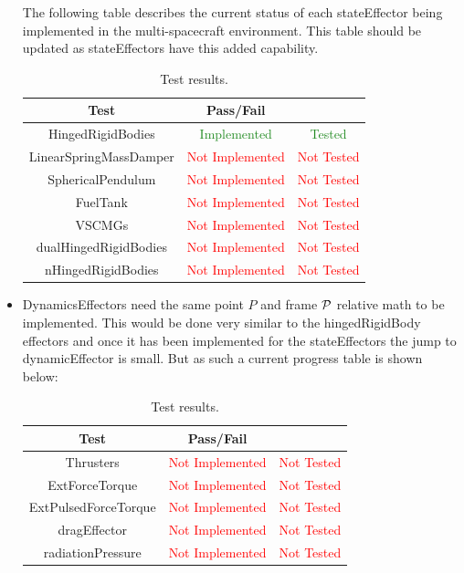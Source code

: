\begin{itemize}
The following table describes the current status of each stateEffector being implemented in the multi-spacecraft environment. This table should be updated as stateEffectors have this added capability. 

\begin{table}[htbp]
	\caption{Test results.}
	\label{tab:results}
	\centering \fontsize{10}{10}\selectfont
	\begin{tabular}{c | c | c } %
		\hline
		\textbf{Test} 				    & \textbf{Pass/Fail} &  \\ \hline
		HingedRigidBodies  & \textcolor{ForestGreen}{Implemented} & \textcolor{ForestGreen}{Tested} \\
		LinearSpringMassDamper  & \textcolor{Red}{Not Implemented} & \textcolor{Red}{Not Tested} \\ 
		SphericalPendulum  & \textcolor{Red}{Not Implemented} & \textcolor{Red}{Not Tested} \\ 
		FuelTank  & \textcolor{Red}{Not Implemented} & \textcolor{Red}{Not Tested} \\ 
		VSCMGs  & \textcolor{Red}{Not Implemented} & \textcolor{Red}{Not Tested} \\ 
		dualHingedRigidBodies  & \textcolor{Red}{Not Implemented} & \textcolor{Red}{Not Tested} \\ 
		nHingedRigidBodies  & \textcolor{Red}{Not Implemented} & \textcolor{Red}{Not Tested} \\ 
		\hline
	\end{tabular}
\end{table}
\clearpage

\item DynamicsEffectors need the same point $P$ and frame $\cal P$ relative math to be implemented. This would be done very similar to the hingedRigidBody effectors and once it has been implemented for the stateEffectors the jump to dynamicEffector is small. But as such a current progress table is shown below:

\begin{table}[htbp]
	\caption{Test results.}
	\label{tab:results}
	\centering \fontsize{10}{10}\selectfont
	\begin{tabular}{c | c | c } %
		\hline
		\textbf{Test} 				    & \textbf{Pass/Fail} &  \\ \hline
		Thrusters  & \textcolor{Red}{Not Implemented} & \textcolor{Red}{Not Tested} \\ 
		ExtForceTorque  & \textcolor{Red}{Not Implemented} & \textcolor{Red}{Not Tested} \\ 
		ExtPulsedForceTorque  & \textcolor{Red}{Not Implemented} & \textcolor{Red}{Not Tested} \\ 
		dragEffector  & \textcolor{Red}{Not Implemented} & \textcolor{Red}{Not Tested} \\ 
		radiationPressure  & \textcolor{Red}{Not Implemented} & \textcolor{Red}{Not Tested} \\ 
		\hline
	\end{tabular}
\end{table}


\end{itemize}
